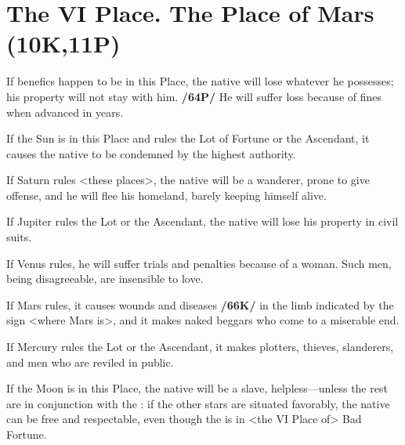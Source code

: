 \section{The VI Place. The Place of Mars (10K,11P)}

If benefics happen to be in this Place, the native will lose whatever he possesses; his property will not stay with him. \textbf{/64P/} He will suffer loss because of fines when advanced in years. 

If the Sun is in this Place and rules the Lot of Fortune or the Ascendant, it causes the native to be condemned by the highest authority. 

If Saturn rules <these places>, the native will be a wanderer, prone to give offense, and he will flee his homeland, barely keeping himself alive. 

If Jupiter rules the Lot or the Ascendant, the native will lose his property in civil suits. 

If Venus rules, he will suffer trials and penalties because of a woman. Such men, being disagreeable, are insensible to love. 

If Mars rules, it causes wounds and diseases \textbf{/66K/} in the limb indicated by the sign <where Mars is>, and it makes naked beggars who come to a miserable end. 

If Mercury rules the Lot or the Ascendant, it makes plotters, thieves, slanderers, and men who are reviled in
public. 

If the Moon is in this Place, the native will be a slave, helpless—unless the rest are in conjunction with the \Moon: if the other stars are situated favorably, the native can be free and respectable, even though the \Moon\xspace is in <the VI Place of> Bad Fortune.

\newpage